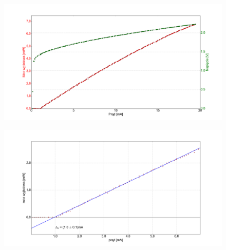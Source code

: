 \documentclass[xcolor={dvipsnames,table}]{beamer}
\begin{document}
\begin{frame}
\center
\begin{figure}
   \includegraphics[width=1.10\textwidth,natwidth=69,natheight=87]{temp_10_IVL.png}
\end{figure}

\end{frame}


\begin{frame}
\center
\begin{figure}
   \includegraphics[width=1.10\textwidth,natwidth=69,natheight=87]{temp_10_fit.png}
\end{figure}
\end{frame}
\end{document}

